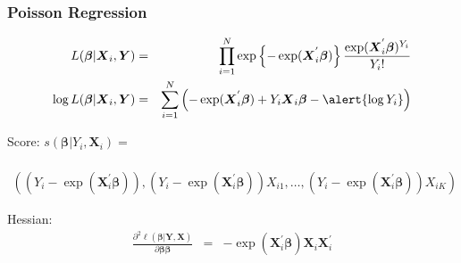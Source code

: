 \documentclass{beamer}
\begin{document}
\begin{frame}
\frametitle{Poisson Regression}

\begin{eqnarray}
L(\boldsymbol{\beta}| \boldsymbol{X}_{i}, \boldsymbol{Y}) & = & \prod_{i=1}^{N} \exp\left\{ - \exp(\boldsymbol{X}_{i}^{'} \boldsymbol{\beta})\right\} \frac{\exp(\boldsymbol{X}_{i}^{'} \boldsymbol{\beta})^{Y_{i}}}{Y_{i}!} \nonumber \\
\log L(\boldsymbol{\beta}| \boldsymbol{X}_{i}, \boldsymbol{Y}) & = & \sum_{i=1}^{N} \left( - \exp(\boldsymbol{X}_{i}^{'}\boldsymbol{\beta}) + Y_{i}\boldsymbol{X}_{i}\boldsymbol{\beta}  -\alert{ \log Y_{i}  }   \right) \nonumber
\end{eqnarray}

Score:  $s(\boldsymbol{\beta} | Y_{i}, \boldsymbol{X}_{i}) = $
\begin{small}
\begin{eqnarray}
&& \nonumber \\
\left( (Y_{i}- \exp(\boldsymbol{X}_{i}^{'} \boldsymbol{\beta}) ), (Y_{i}- \exp(\boldsymbol{X}_{i}^{'} \boldsymbol{\beta}) )X_{i1} , \hdots, (Y_{i}- \exp(\boldsymbol{X}_{i}^{'} \boldsymbol{\beta}) )X_{iK}     \right) &&\nonumber
\end{eqnarray}
\end{small}

Hessian:
\begin{eqnarray}
\frac{\partial^{2} \ell (\boldsymbol{\beta} | \boldsymbol{Y}, \boldsymbol{X} )}{\partial \boldsymbol{\beta} \boldsymbol{\beta}} & = & - \exp(\boldsymbol{X}_{i}^{'} \boldsymbol{\beta}) \boldsymbol{X}_{i} \boldsymbol{X}_{i}^{'} \nonumber
\end{eqnarray}


\end{frame}
\end{document}
